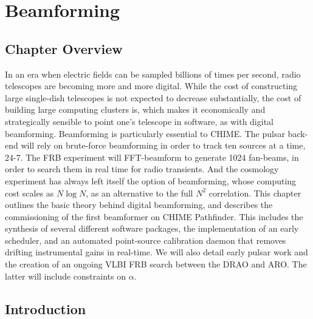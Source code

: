 \chapter{Beamforming}
\label{chapter:beamforming}




\section{Chapter Overview}

In an era when electric fields can be sampled billions of 
times per second, radio telescopes are becoming more and more digital. 
While the cost of constructing large single-dish telescopes is not expected to
decrease substantially, the cost of building large computing clusters is, 
which makes it economically and strategically sensible to 
point one's telescope in software, as with digital beamforming.
Beamforming is particularly essential to CHIME. The pulsar back-end will rely on
brute-force beamforming in order to track ten sources at a time, 24-7.  
The FRB experiment will FFT-beamform to generate 1024 fan-beams, 
in order to search them in real time for radio transients. And the cosmology 
experiment has always left itself the option of beamforming, whose 
computing cost scales as $N\log N$, as 
an alternative to the full $N^2$ correlation. This chapter outlines the 
basic theory behind digital beamforming, and describes the commissioning 
of the first beamformer on CHIME Pathfinder. This includes the synthesis 
of several different software packages, the implementation of an early scheduler, 
and an automated point-source calibration daemon that removes drifting instrumental 
gains in real-time. We will also detail early pulsar 
work and the creation of an ongoing VLBI FRB search between 
the DRAO and ARO. The latter will include constraints on $\alpha$.


\section{Introduction}

